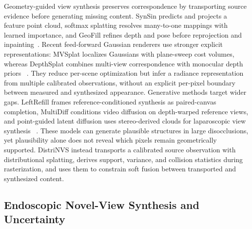 \documentclass[letterpaper,10pt,conference]{ieeeconf}
\begin{document}
Geometry-guided view synthesis preserves correspondence by transporting source
evidence before generating missing content. SynSin predicts and projects a
feature point cloud, softmax splatting resolves many-to-one mappings with
learned importance, and GeoFill refines depth and pose before reprojection and
inpainting~\cite{wiles2020synsin,niklaus2020softmax,zhao2023geofill}. Recent
feed-forward Gaussian renderers use stronger explicit representations: MVSplat
localizes Gaussians with plane-sweep cost volumes, whereas DepthSplat combines
multi-view correspondence with monocular depth priors
~\cite{chen2024mvsplat,xu2025depthsplat}. They reduce per-scene optimization but
infer a radiance representation from multiple calibrated observations, without
an explicit per-pixel boundary between measured and synthesized appearance.
Generative methods target wider gaps. LeftRefill frames reference-conditioned
synthesis as paired-canvas completion, MultiDiff conditions video diffusion on
depth-warped reference views, and point-guided latent diffusion uses
stereo-derived clouds for laparoscopic view synthesis
~\cite{cao2024leftrefill,muller2024multidiff,tang2025pointguided}. These models can
generate plausible structures in large disocclusions, yet plausibility alone
does not reveal which pixels remain geometrically supported. DistriNVS instead
transports a calibrated source observation with distributional splatting,
derives support, variance, and collision statistics during rasterization, and
uses them to constrain soft fusion between transported and synthesized content.

\subsection{Endoscopic Novel-View Synthesis and Uncertainty}
\end{document}
